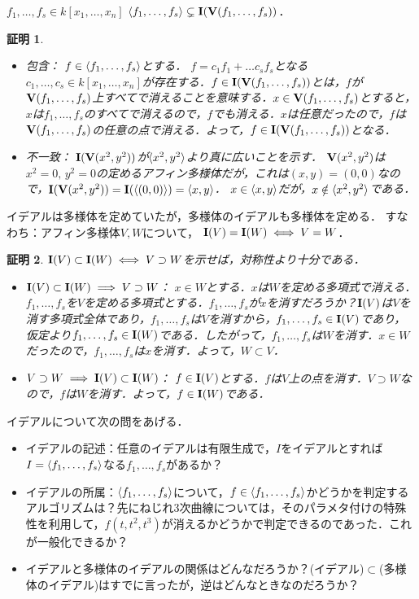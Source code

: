 \documentclass[9pt]{ltjsarticle}
\theoremstyle{break}
\theoremstyle{break}
\theoremstyle{break}
\theoremstyle{break}
\theoremstyle{break}
\theoremstyle{break}
\theoremstyle{break}
\theoremstyle{break}
\theoremstyle{break}
\theoremstyle{break}
\theoremstyle{break}
\theoremstyle{break}
\theoremstyle{break}
\theoremstyle{break}
\theoremstyle{break}
\theoremstyle{nonumberbreak}
\newtheorem{myproof}{証明}
\theoremstyle{nonumberbreak}
\begin{document}
$f_1,\dots,f_s \in k[x_1,\dots,x_n]$
$\langle f_1,\dots,f_s \rangle\subsetneq \textbf I(\textbf V(f_1,\dots,f_s))$．
\begin{myproof}
 \begin{itemize}
  \item 包含：
$f\in \langle f_1,\dots,f_s \rangle$とする．
$f=c_1 f_1 + \dots c_s f_s$となる$c_1,\dots,c_s \in k[x_1,\dots,x_n]$が存在する．$f\in \textbf I(\textbf V(f_1,\dots,f_s))$とは，$f$が$\textbf V(f_1,\dots,f_s)$上すべてで消えることを意味する．$x\in \textbf V(f_1,\dots,f_s)$とすると，$x$は$f_1,\dots,f_s$のすべてで消えるので，$f$でも消える．$x$は任意だったので，$f$は$\textbf V(f_1,\dots,f_s)$の任意の点で消える．よって，$f\in \textbf I(\textbf V(f_1,\dots,f_s))$となる．
  \item 不一致：
$\textbf I(\textbf V(x^2,y^2))$が$\langle x^2,y^2 \rangle$より真に広いことを示す．
$\textbf V(x^2,y^2)$は$x^2=0,\,y^2=0$の定めるアフィン多様体だが，これは$(x,y)=(0,0)$なので，$\textbf I(\textbf V(x^2,y^2))=\textbf I(\langle (0,0) \rangle)=\langle x,y \rangle$．
$x\in \langle x,y \rangle$だが，$x\notin \langle x^2,y^2 \rangle$である．
 \end{itemize}
\end{myproof}

イデアルは多様体を定めていたが，多様体のイデアルも多様体を定める．
すなわち：アフィン多様体$V,W$について，
$\textbf I(V)=\textbf I(W) \iff V=W$．
\begin{myproof}
 $\textbf I(V)\subset \textbf I(W)\iff V\supset W$を示せば，対称性より十分である．
\begin{itemize}
 \item $\textbf I(V)\subset \textbf I(W)\implies V\supset W$：
$x\in W$とする．$x$は$W$を定める多項式で消える．$f_1,\dots,f_s$を$V$を定める多項式とする．$f_1,\dots,f_s$が$x$を消すだろうか？$\textbf I(V)$は$V$を消す多項式全体であり，$f_1,\dots,f_s$は$V$を消すから，$f_1,\dots,f_s \in \textbf I(V)$であり，仮定より$f_1,\dots,f_s \in \textbf I(W)$である．したがって，$f_1,\dots,f_s$は$W$を消す．$x\in W$だったので，$f_1,\dots,f_s$は$x$を消す．よって，$W\subset V$．
 \item $V\supset W \implies \textbf I(V)\subset \textbf I(W)$：
$f\in \textbf I(V)$とする．$f$は$V$上の点を消す．$V\supset W$なので，$f$は$W$を消す．よって，$f\in \textbf I(W)$である．
\end{itemize}
\end{myproof}

イデアルについて次の問をあげる．
\begin{itemize}
 \item イデアルの記述：任意のイデアルは有限生成で，$I$をイデアルとすれば$I=\langle f_1,\dots,f_s \rangle$なる$f_1,\dots,f_s$があるか？
 \item イデアルの所属：$\langle f_1,\dots,f_s \rangle$について，$f\in \langle f_1,\dots,f_s \rangle$かどうかを判定するアルゴリズムは？先にねじれ3次曲線については，そのパラメタ付けの特殊性を利用して，$f(t,t^2,t^3)$が消えるかどうかで判定できるのであった．これが一般化できるか？
 \item イデアルと多様体のイデアルの関係はどんなだろうか？(イデアル)$\subset$(多様体のイデアル)はすでに言ったが，逆はどんなときなのだろうか？
\end{itemize}
\end{document}
